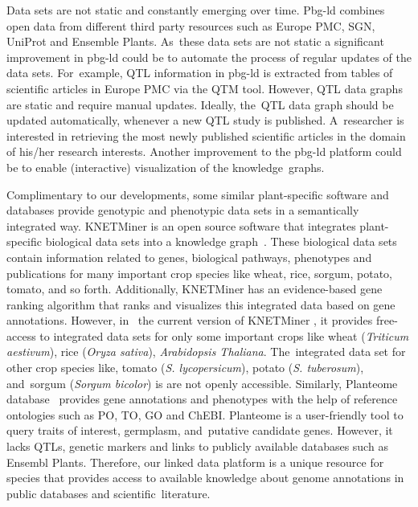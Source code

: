 \documentclass[applsci,article,accept,moreauthors,pdftex]{Definitions/mdpi}
\begin{document}
{Data sets are not static and constantly emerging over time. Pbg-ld combines open data from different third party resources such as Europe PMC, SGN, UniProt and Ensemble Plants. As~these data sets are not static a significant improvement in pbg-ld could be to automate the process of regular updates of the data sets. For~example, QTL information in pbg-ld is extracted from tables of scientific articles in Europe PMC via the QTM tool. However, QTL data graphs are static and require manual updates. Ideally, the~QTL data graph should be updated automatically, whenever a new QTL study is published. A~researcher is interested in retrieving the most newly published scientific articles in the domain of his/her research interests. Another improvement to the pbg-ld platform could be to enable (interactive) visualization of the knowledge~graphs.  

Complimentary to our developments, some similar plant-specific software and databases provide genotypic and phenotypic data sets in a semantically integrated way. KNETMiner is an open source software that integrates plant-specific biological data sets into a knowledge graph~\cite{hassani2017knowledge}. These biological data sets contain information related to genes, biological pathways, phenotypes and publications for many important crop species like wheat, rice, sorgum, potato, tomato, and so forth. Additionally, KNETMiner has an evidence-based gene ranking algorithm that ranks and visualizes this integrated data based on gene annotations. {However, in~ the current version of KNETMiner} \cite{Knetresources}{, it provides free-access to integrated data sets for only some important crops like wheat (\textit{Triticum aestivum}), rice (\textit{Oryza sativa}), \textit{Arabidopsis Thaliana}. The~integrated data set for other crop species like, tomato (\textit{S. lycopersicum}), potato (\textit{S. tuberosum}), and~sorgum (\textit{Sorgum bicolor}) is are not openly accessible. } Similarly, Planteome database~\cite{Cooper2018} provides gene annotations and phenotypes with the help of reference ontologies such as PO, TO, GO and ChEBI. Planteome is a user-friendly tool to query traits of interest, germplasm, and~putative candidate genes. However, it lacks QTLs, genetic markers and links to publicly available databases such as Ensembl Plants. Therefore, our linked data platform is a unique resource for  %
species that provides access to available knowledge about genome annotations in public databases and scientific~literature.

}
\end{document}
